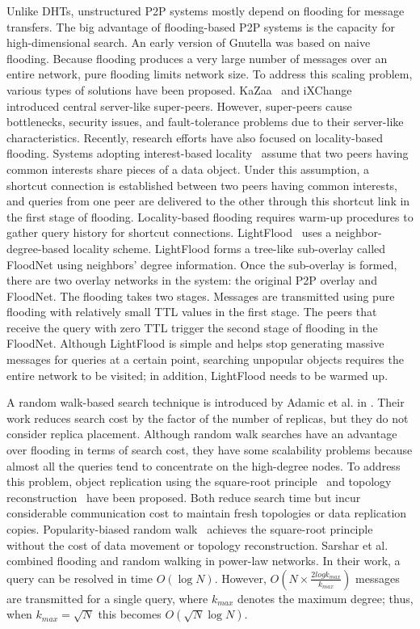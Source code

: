 \documentclass[9.5pt,journal,final,finalsubmission,twocolumn]{IEEEtran}
\begin{document}
Unlike DHTs, unstructured P2P systems mostly depend on flooding 
for message transfers. The big advantage of flooding-based P2P systems 
is the capacity for high-dimensional search.
An early version of Gnutella was based on naive
flooding. Because flooding produces a very large number of
messages over an entire 
network, pure flooding limits network size. 
To address this scaling problem, various types of solutions have been 
proposed. KaZaa~\cite{kazaa} and iXChange~\cite{JohnstoneSM05} 
introduced central server-like super-peers. 
However, super-peers cause bottlenecks, security issues, and
fault-tolerance problems due to their server-like characteristics. 
Recently, research efforts have also focused on locality-based flooding. Systems 
adopting interest-based locality~\cite{Guo04,Guo05,SMZ03} assume that 
two peers having common interests share pieces of a data object. 
Under this assumption, a shortcut 
connection is established between two peers having common interests, 
and queries from one peer are delivered to the other through this 
shortcut link in the first stage of flooding. 
Locality-based flooding requires warm-up procedures to gather query 
history for shortcut connections. 
LightFlood~\cite{JiangGZW08} uses 
a neighbor-degree-based locality scheme. 
LightFlood forms a tree-like sub-overlay called 
FloodNet using neighbors' degree information. Once the sub-overlay 
is formed, there are two overlay networks in the system: the original 
P2P overlay and FloodNet. The flooding takes two stages.
Messages are transmitted using pure flooding with relatively small TTL values 
in the first stage. The peers that receive the query with zero TTL trigger 
the second stage of flooding in the FloodNet. Although 
LightFlood is simple and helps stop generating massive messages 
for queries at a certain point, searching unpopular objects requires  
the entire network to be visited; in addition, LightFlood needs to 
be warmed up.  

A random walk-based search technique is introduced by Adamic et al. 
in \cite{alph:powerlaw01}. 
Their work reduces search cost by the factor of the number of replicas, 
but they do not consider replica placement. 
Although random walk searches have an advantage over flooding
in terms of search cost, they have some
scalability problems because almost all the queries tend to concentrate
on the high-degree nodes. To address this problem, object
replication using the square-root principle~\cite{CohenS02,LCKS02}
and topology reconstruction~\cite{Cooper05} have been proposed. 
Both reduce search time but incur considerable communication cost 
to maintain fresh topologies or data replication copies. 
Popularity-biased random walk~\cite{zs:popularity06}
achieves the square-root principle without the cost of data movement or
topology reconstruction. Sarshar et al. \cite{ns:percolation}
combined flooding and random walking in power-law networks. In their
work, a query can be resolved in time $O(\log N)$. However,
$O(N\times \frac{2log k_{max}}{k_{max}})$ messages are
transmitted for a single query, where $k_{max}$ denotes the maximum
degree; thus, when $k_{max} = \sqrt{N}$ this becomes $O(\sqrt N \log N)$.
\end{document}
